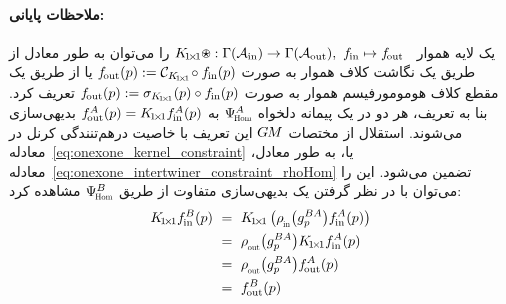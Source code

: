 \paragraph{ملاحظات پایانی:}
یک لایه هموار \onexoneGM\ $K_{\!1\!\times\!1} \ostar: \Gamma(\Ain)\to \Gamma(\Aout),\ \fin\mapsto \fout$ را می‌توان به طور معادل از طریق یک نگاشت کلاف هموار به صورت $\fout(p) := \mathcal{C}_{K_{\!1\!\times\!1}} \!\circ \fin(p)$ یا از طریق یک مقطع کلاف هومومورفیسم هموار به صورت $f_\textup{\:\!\!out}(p) := \sigma_{K_{\!1\!\times\!1}}(p) \circ f_\textup{\;\!\!in}(p)$ تعریف کرد.
بنا به تعریف، هر دو در یک پیمانه دلخواه $\PsiHom^A$ به $f_\textup{\:\!\!out}^A(p) = K_{\!1\!\times\!1} f_\textup{\;\!\!in}^A(p)$ بدیهی‌سازی می‌شوند.
استقلال از مختصات $G\mkern-1.4muM$ این تعریف با خاصیت درهم‌تنندگی کرنل در معادله~\eqref{eq:onexone_kernel_constraint} یا، به طور معادل، معادله~\eqref{eq:onexone_intertwiner_constraint_rhoHom} تضمین می‌شود.
این را می‌توان با در نظر گرفتن یک بدیهی‌سازی متفاوت از طریق $\PsiHom^B$ مشاهده کرد:
\begin{align}
    K_{\!1\!\times\!1} \fin^B(p)
    \ &=\ K_{\!1\!\times\!1} \left( \rhoin\big(g^{BA}_p\big) \fin^A(p) \right) \notag \\
    \ &=\ \rhoout\big(g^{BA}_p\big) K_{\!1\!\times\!1} \fin^A(p) \notag \\
    \ &=\ \rhoout\big(g^{BA}_p\big) \fout^A(p) \notag \\
    \ &=\ \fout^B(p)
\end{align}